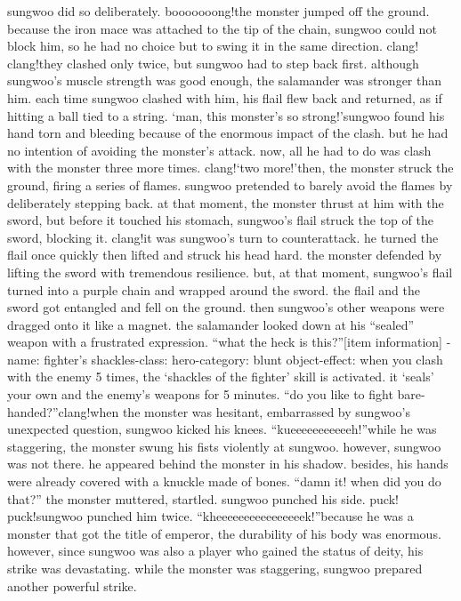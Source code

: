 sungwoo did so deliberately.
booooooong!the monster jumped off the ground.
 because the iron mace was attached to the tip of the chain, sungwoo could not block him, so he had no choice but to swing it in the same direction.
clang! clang!they clashed only twice, but sungwoo had to step back first.
 although sungwoo’s muscle strength was good enough, the salamander was stronger than him.
each time sungwoo clashed with him, his flail flew back and returned, as if hitting a ball tied to a string.
‘man, this monster’s so strong!’sungwoo found his hand torn and bleeding because of the enormous impact of the clash.
 but he had no intention of avoiding the monster’s attack.
now, all he had to do was clash with the monster three more times.
clang!‘two more!’then, the monster struck the ground, firing a series of flames.
 sungwoo pretended to barely avoid the flames by deliberately stepping back.
at that moment, the monster thrust at him with the sword, but before it touched his stomach, sungwoo’s flail struck the top of the sword, blocking it.
clang!it was sungwoo’s turn to counterattack.
he turned the flail once quickly then lifted and struck his head hard.
 the monster defended by lifting the sword with tremendous resilience.
but, at that moment, sungwoo’s flail turned into a purple chain and wrapped around the sword.
 the flail and the sword got entangled and fell on the ground.
 then sungwoo’s other weapons were dragged onto it like a magnet.
the salamander looked down at his “sealed” weapon with a frustrated expression.
“what the heck is this?”[item information]
-name: fighter’s shackles-class: hero-category: blunt object-effect: when you clash with the enemy 5 times, the ‘shackles of the fighter’ skill is activated.
 it ‘seals’ your own and the enemy’s weapons for 5 minutes.
“do you like to fight bare-handed?”clang!when the monster was hesitant, embarrassed by sungwoo’s unexpected question, sungwoo kicked his knees.
“kueeeeeeeeeeeh!”while he was staggering, the monster swung his fists violently at sungwoo.
however, sungwoo was not there.
 he appeared behind the monster in his shadow.
 besides, his hands were already covered with a knuckle made of bones.
“damn it! when did you do that?” the monster muttered, startled.
sungwoo punched his side.
puck! puck!sungwoo punched him twice.
“kheeeeeeeeeeeeeeeek!”because he was a monster that got the title of emperor, the durability of his body was enormous.
 however, since sungwoo was also a player who gained the status of deity, his strike was devastating.
 while the monster was staggering, sungwoo prepared another powerful strike.
